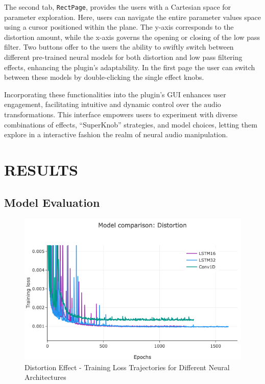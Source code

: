 \documentclass{article}
\newcommand{\quotes}[1]{``#1''}
\begin{document}
\begin{sloppy}
The second tab, \texttt{RectPage}, provides the users with a Cartesian space for parameter exploration. Here, users can navigate the entire parameter values space using a cursor positioned within the plane. The y-axis corresponds to the distortion amount, while the x-axis governs the opening or closing of the low pass filter. Two buttons offer to the users the ability to swiftly switch between different pre-trained neural models for both distortion and low pass filtering effects, enhancing the plugin's adaptability. In the first page the user can switch between these models by double-clicking the single effect knobs.

Incorporating these functionalities into the plugin's GUI enhances user engagement, facilitating intuitive and dynamic control over the audio transformations. This interface empowers users to experiment with diverse combinations of effects, \quotes{SuperKnob} strategies, and model choices, letting them explore in a interactive fashion the realm of neural audio manipulation.

\section{RESULTS}
\label{sec:results}

\subsection{Model Evaluation}
\label{ssec:modelEval}

\begin{figure}[t]
  \centering
  \centerline{\includegraphics[width=\columnwidth]{./plots/trimmedImgs/dist trainLoss.png}}
  \caption{Distortion Effect - Training Loss Trajectories for Different Neural Architectures}
  \label{fig:distTrain}
\end{figure}


\end{sloppy}
\end{document}
